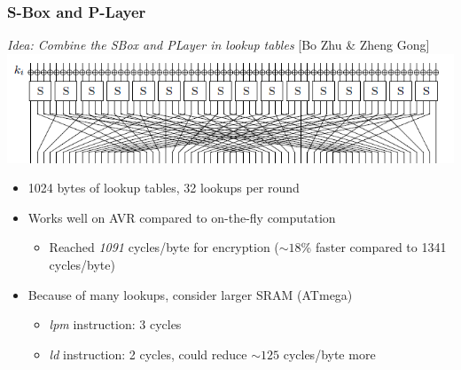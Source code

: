 \documentclass{beamer}
\begin{document}
\begin{frame}[fragile]
\frametitle{S-Box and P-Layer}
\emph{Idea: Combine the SBox and PLayer in lookup tables} [Bo Zhu \& Zheng Gong]
\includegraphics[width=\textwidth]{spnet.png}
\pause
\begin{itemize}[<+->]
\item 1024 bytes of lookup tables, 32 lookups per round
\item Works well on AVR compared to on-the-fly computation
  \begin{itemize}
    \item Reached \emph{1091} cycles/byte for encryption ($\sim18$\% faster compared to 1341 cycles/byte)
  \end{itemize}
\item Because of many lookups, consider larger SRAM (ATmega)
  \begin{itemize}
    \item \textit{lpm} instruction: 3 cycles
    \item \textit{ld} instruction: 2 cycles, could reduce $\sim125$ cycles/byte more
  \end{itemize}
\end{itemize}
\end{frame}
\end{document}
